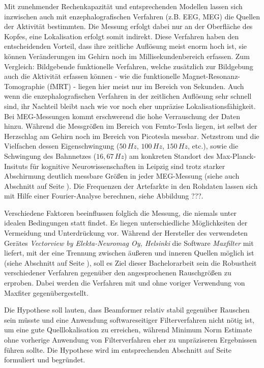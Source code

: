 \documentclass[doc,a4paper,12pt]{apa6}
\makeatletter
\DeclareRobustCommand*{\nameref}[1]{%
      \glqq{\myorg@nameref{#1}}\grqq%
    }%
\makeatother
\begin{document}
Mit zunehmender Rechenkapazität und entsprechenden Modellen lassen sich inzwischen auch mit enzephalografischen Verfahren (z.B. EEG, MEG) die Quellen der Aktivität bestimmten. Die Messung erfolgt dabei nur an der Oberfläche des Kopfes, eine Lokalisation erfolgt somit indirekt. Diese Verfahren haben den entscheidenden Vorteil, dass ihre zeitliche Auflösung meist enorm hoch ist, sie können Veränderungen im Gehirn noch im Millisekundenbereich erfassen. Zum Vergleich: Bildgebende funktionelle Verfahren, welche zusätzlich zur Bildgebung auch die Aktivität erfassen können - wie die funktionelle Magnet-Resonanz-Tomographie (fMRT) - liegen hier meist nur im Bereich von Sekunden. Auch wenn die enzephalografischen Verfahren in der zeitlichen Auflösung sehr schnell sind, ihr Nachteil bleibt nach wie vor noch eher unpräzise Lokalisationsfähigkeit. Bei MEG-Messungen kommt erschwerend die hohe Verrauschung der Daten hinzu. Während die Messgrößen im Bereich von Femto-Tesla liegen, ist selbst der Herzschlag am Gehirn noch im Bereich von Picotesla messbar. Netzstrom und die Vielfachen dessen Eigenschwingung ($50\,Hz$, $100\,Hz$, $150\,Hz$, etc.), sowie die Schwingung des Bahnnetzes ($16,67\,Hz$) am konkreten Standort des Max-Planck-Insituts für kognitive Neurowissenschaften in Leipzig sind trotz starker Abschirmung deutlich messbare Größen in jeder MEG-Messung (siehe auch Abschnitt \nameref{sec:rauschen} auf Seite \pageref{sec:rauschen}). Die Frequenzen der Artefarkte in den Rohdaten lassen sich mit Hilfe einer Fourier-Analyse berechnen, siehe Abbildung ???.

Verschiedene Faktoren beeinflussen folglich die Messung, die niemals unter idealen Bedingungen statt findet. Es liegen unterschiedliche Möglichkeiten der Vermeidung und Unterdrückung vor. Während der Hersteller des verwendeten Gerätes \emph{Vectorview by Elekta-Neuromag Oy, Helsinki} die Software \emph{Maxfilter} mit liefert, mit der eine Trennung zwischen äußeren und inneren Quellen möglich ist (siehe Abschnitt \nameref{sec:maxfilter} auf Seite \pageref{sec:maxfilter}), soll es Ziel dieser Bachelorarbeit sein die Robustheit verschiedener Verfahren gegenüber den angesprochenen Rauschgrößen zu erproben. Dabei werden die Verfahren mit und ohne voriger Verwendung von Maxfiter gegenübergestellt.

Die Hypothese soll lauten, dass Beamformer relativ stabil gegenüber Rauschen sein müsste und eine Anwendung softwareseitiger Filterverfahren nicht nötig ist, um eine gute Quelllokalisation zu erreichen, während Minimum Norm Estimate ohne vorherige Anwendung von Filterverfahren eher zu unpräziseren Ergebnissen führen sollte. Die Hypothese wird im entsprechenden Abschnitt auf Seite \pageref{sec:hypo} formuliert und begründet.
\end{document}
